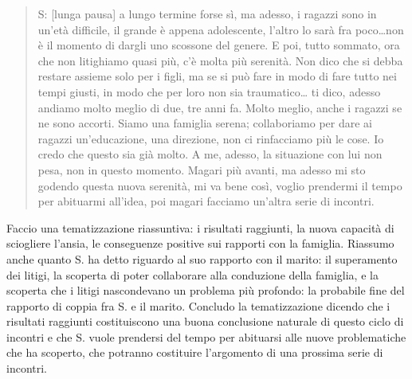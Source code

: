 \begin{verse}
S: [lunga pausa] a lungo termine forse sì, ma adesso, i ragazzi sono in un'età difficile, il grande è appena adolescente, l'altro lo sarà fra poco\ldots non è il momento di dargli uno scossone del genere. E poi, tutto sommato, ora che non litighiamo quasi più, c'è molta più serenità. Non dico che si debba restare assieme solo per i figli, ma se si può fare in modo di fare tutto nei tempi giusti, in modo che per loro non sia traumatico\ldots{} ti dico, adesso andiamo molto meglio di due, tre anni fa. Molto meglio, anche i ragazzi se ne sono accorti. Siamo una famiglia serena; collaboriamo per dare ai ragazzi un'educazione, una direzione, non ci rinfacciamo più le cose. Io credo che questo sia già molto. A me, adesso, la situazione con lui non pesa, non in questo momento. Magari  più avanti, ma adesso mi sto godendo questa nuova serenità, mi va bene così, voglio prendermi il tempo per abituarmi all'idea, poi magari facciamo un'altra serie di incontri.
\end{verse}

\noindent Faccio una tematizzazione riassuntiva: i risultati raggiunti, la nuova capacità di sciogliere l'ansia, le conseguenze positive sui rapporti con la famiglia. Riassumo anche quanto S. ha detto riguardo al suo rapporto con il marito: il superamento dei litigi, la scoperta di poter collaborare alla conduzione della famiglia, e la scoperta che i litigi nascondevano un problema più profondo: la probabile fine del rapporto di coppia fra S. e il marito. Concludo la tematizzazione dicendo che i risultati raggiunti costituiscono una buona conclusione naturale di questo ciclo di incontri e che S. vuole prendersi del tempo per abituarsi alle nuove problematiche che ha scoperto, che potranno costituire l'argomento di una prossima serie di incontri.
